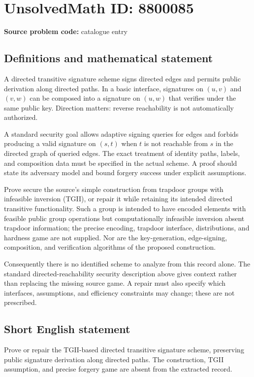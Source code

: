 \documentclass[11pt]{article}
\begin{document}
\section*{UnsolvedMath ID: 8800085}
\textbf{Source problem code:} catalogue entry
\subsection{Definitions and mathematical statement}
A directed transitive signature scheme signs directed edges and permits public derivation along directed paths. In a basic interface, signatures on $(u,v)$ and $(v,w)$ can be composed into a signature on $(u,w)$ that verifies under the same public key. Direction matters: reverse reachability is not automatically authorized.

A standard security goal allows adaptive signing queries for edges and forbids producing a valid signature on $(s,t)$ when $t$ is not reachable from $s$ in the directed graph of queried edges. The exact treatment of identity paths, labels, and composition data must be specified in the actual scheme. A proof should state its adversary model and bound forgery success under explicit assumptions.

Prove secure the source's simple construction from trapdoor groups with infeasible inversion (TGII), or repair it while retaining its intended directed transitive functionality. Such a group is intended to have encoded elements with feasible public group operations but computationally infeasible inversion absent trapdoor information; the precise encoding, trapdoor interface, distributions, and hardness game are not supplied. Nor are the key-generation, edge-signing, composition, and verification algorithms of the proposed construction.

Consequently there is no identified scheme to analyze from this record alone. The standard directed-reachability security description above gives context rather than replacing the missing source game. A repair must also specify which interfaces, assumptions, and efficiency constraints may change; these are not prescribed.
\subsection{Short English statement}
Prove or repair the TGII-based directed transitive signature scheme, preserving public signature derivation along directed paths. The construction, TGII assumption, and precise forgery game are absent from the extracted record.
\end{document}
